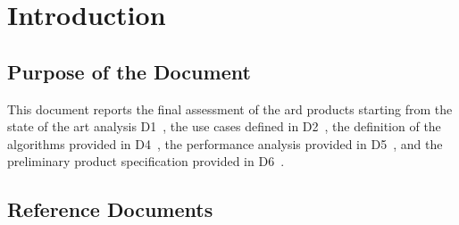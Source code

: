 \section{Introduction}

\subsection{Purpose of the Document}
This document reports the final assessment of the \acs{ard} products starting from the state of the art analysis D1~\cite{D1}, the use cases defined in D2~\cite{D2}, the definition of the algorithms provided in D4~\cite{D4}, the performance analysis provided in D5~\cite{D5}, and the preliminary product specification provided in D6~\cite{D6}. 

\subsection{Reference Documents}

\renewcommand{\refname}{}
\vspace{-2em}



\clearpage

